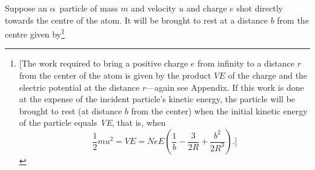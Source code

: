 Suppose an $\alpha$~particle of mass $m$ and velocity $u$\label{s:rutherford_u} and
charge $e$ shot directly towards the centre of the atom. It will be
brought to rest at a distance $b$ from the centre given
by\footnote{{[}The work required to bring a positive charge $e$
  from infinity to a distance $r$ from the center of the atom is
  given by the product $VE$ of the charge and the electric
  potential at the distance $r$---again see Appendix. If this
  work is done at the expense of the incident particle's kinetic energy,
  the particle will be brought to rest (at distance $b$ from the
  center) when the initial kinetic energy of the particle equals
  \emph{VE}, that is, when
  \begin{equation*}
  \frac{1}{2}mu^2 = VE = NeE\left(\frac{1}{b}-\frac{3}{2R}+\frac{b^2}{2R^3}\right).]
  \end{equation*}}

